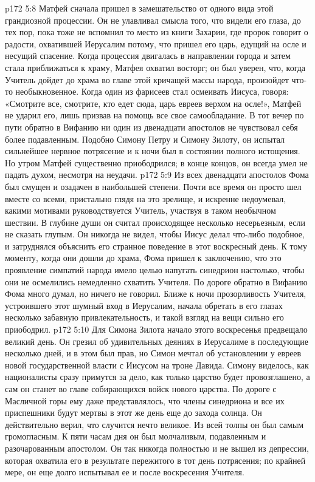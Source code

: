 \vs p172 5:8 \pc Матфей сначала пришел в замешательство от одного вида этой грандиозной процессии. Он не улавливал смысла того, что видели его глаза, до тех пор, пока тоже не вспомнил то место из книги Захарии, где пророк говорит о радости, охватившей Иерусалим потому, что пришел его царь, едущий на осле и несущий спасение. Когда процессия двигалась в направлении города и затем стала приближаться к храму, Матфея охватил восторг; он был уверен, что, когда Учитель дойдет до храма во главе этой кричащей массы народа, произойдет что\hyp{}то необыкновенное. Когда один из фарисеев стал осмеивать Иисуса, говоря: «Смотрите все, смотрите, кто едет сюда, царь евреев верхом на осле!», Матфей не ударил его, лишь призвав на помощь все свое самообладание. В тот вечер по пути обратно в Вифанию ни один из двенадцати апостолов не чувствовал себя более подавленным. Подобно Симону Петру и Симону Зилоту, он испытал сильнейшее нервное потрясение и к ночи был в состоянии полного истощения. Но утром Матфей существенно приободрился; в конце концов, он всегда умел не падать духом, несмотря на неудачи.
\vs p172 5:9 \pc Из всех двенадцати апостолов Фома был смущен и озадачен в наибольшей степени. Почти все время он просто шел вместе со всеми, пристально глядя на это зрелище, и искренне недоумевал, какими мотивами руководствуется Учитель, участвуя в таком необычном шествии. В глубине души он считал происходящее несколько несерьезным, если не сказать глупым. Он никогда не видел, чтобы Иисус делал что\hyp{}либо подобное, и затруднялся объяснить его странное поведение в этот воскресный день. К тому моменту, когда они дошли до храма, Фома пришел к заключению, что это проявление симпатий народа имело целью напугать синедрион настолько, чтобы они не осмелились немедленно схватить Учителя. По дороге обратно в Вифанию Фома много думал, но ничего не говорил. Ближе к ночи прозорливость Учителя, устроившего этот шумный вход в Иерусалим, начала обретать в его глазах несколько забавную привлекательность, и такой взгляд на вещи сильно его приободрил.
\vs p172 5:10 Для Симона Зилота начало этого воскресенья предвещало великий день. Он грезил об удивительных деяниях в Иерусалиме в последующие несколько дней, и в этом был прав, но Симон мечтал об установлении у евреев новой государственной власти с Иисусом на троне Давида. Симону виделось, как националисты сразу примутся за дело, как только царство будет провозглашено, а сам он станет во главе собирающихся войск нового царства. По дороге с Масличной горы ему даже представлялось, что члены синедриона и все их приспешники будут мертвы в этот же день еще до захода солнца. Он действительно верил, что случится нечто великое. Из всей толпы он был самым громогласным. К пяти часам дня он был молчаливым, подавленным и разочарованным апостолом. Он так никогда полностью и не вышел из депрессии, которая охватила его в результате пережитого в тот день потрясения; по крайней мере, он еще долго испытывал ее и после воскресения Учителя.
